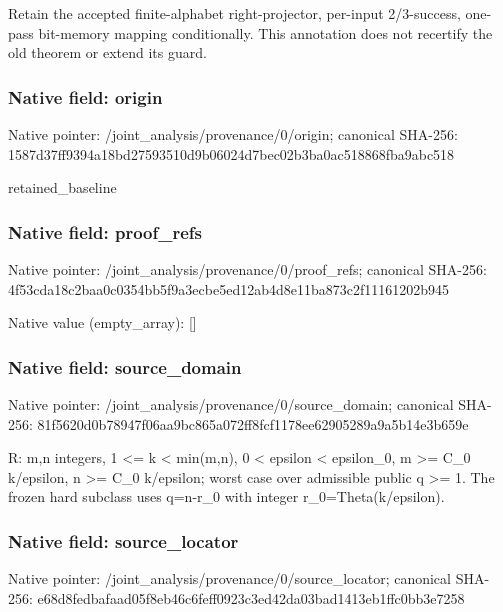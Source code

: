 \documentclass[10pt,a4paper]{article}
\begin{document}
\begingroup\raggedright\sloppy Retain the accepted finite-alphabet right-projector,\allowbreak{} per-input 2/\allowbreak{}3-success,\allowbreak{} one-pass bit-memory mapping conditionally. This annotation does not recertify the old theorem or extend its guard.\par\endgroup

\subsubsection{Native field: origin}
Native pointer: /joint\_\allowbreak{}analysis/provenance/0/origin; canonical SHA-256: 1587d37ff9394a18bd27593510d9b06024d7bec02b3ba0ac518868fba9abc518

\begingroup\raggedright\sloppy retained\_\allowbreak{}baseline\par\endgroup

\subsubsection{Native field: proof\_\allowbreak{}refs}
Native pointer: /joint\_\allowbreak{}analysis/provenance/0/proof\_\allowbreak{}refs; canonical SHA-256: 4f53cda18c2baa0c0354bb5f9a3ecbe5ed12ab4d8e11ba873c2f11161202b945

Native value (empty\_\allowbreak{}array): []

\subsubsection{Native field: source\_\allowbreak{}domain}
Native pointer: /joint\_\allowbreak{}analysis/provenance/0/source\_\allowbreak{}domain; canonical SHA-256: 81f5620d0b78947f06aa9bc865a072ff8fcf1178ee62905289a9a5b14e3b659e

\begingroup\raggedright\sloppy R:\allowbreak{} m,\allowbreak{}n integers,\allowbreak{} 1 <=\allowbreak{} k < min(m,\allowbreak{}n),\allowbreak{} 0 < epsilon < epsilon\_\allowbreak{}0,\allowbreak{} m >=\allowbreak{} C\_\allowbreak{}0 k/\allowbreak{}epsilon,\allowbreak{} n >=\allowbreak{} C\_\allowbreak{}0 k/\allowbreak{}epsilon;\allowbreak{} worst case over admissible public q >=\allowbreak{} 1. The frozen hard subclass uses q=\allowbreak{}n-r\_\allowbreak{}0 with integer r\_\allowbreak{}0=\allowbreak{}Theta(k/\allowbreak{}epsilon).\par\endgroup

\subsubsection{Native field: source\_\allowbreak{}locator}
Native pointer: /joint\_\allowbreak{}analysis/provenance/0/source\_\allowbreak{}locator; canonical SHA-256: e68d8fedbafaad05f8eb46c6feff0923c3ed42da03bad1413eb1ffc0bb3e7258
\end{document}
